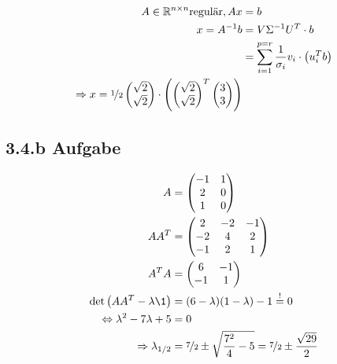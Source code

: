 \begin{equation}\begin{split}
    A\in {\mathbb R}^{n\times n} \text{regulär}, Ax &= b\\
    x = A^{-1} b &= V\Sigma^{-1}U^T\cdot b\\
    &=\sum_{i=1}^{p=r}\frac{1}{\sigma_i} v_i \cdot \left(u_i^Tb\right)\\
    \Rightarrow 
    x = 
    \nicefrac{1}{2}
    \begin{pmatrix}
	    \sqrt{2}\\\sqrt{2}
    \end{pmatrix}
    \cdot 
    \left(
   		\begin{pmatrix}
   			\sqrt{2}\\\sqrt{2}
   		\end{pmatrix}^T
   		\begin{pmatrix}
	   		3\\3
   		\end{pmatrix}
	\right)
\end{split}\end{equation}


\subsection*{3.4.b Aufgabe}

\begin{equation}\begin{split}
    A &= \begin{pmatrix}
	    -1&1\\
	    2&0\\
	    1&0
    \end{pmatrix}\\
    AA^T
    &=
    \begin{pmatrix}
	    2&-2&-1\\
	    -2&4&2\\
	    -1&2&1
    \end{pmatrix}\\
    A^TA
    &=
    \begin{pmatrix}
	    6&-1\\
	    -1&1
    \end{pmatrix}\\
    \det\left(AA^T-\lambda \1\right)
    &=
    (6-\lambda)(1-\lambda) -1 \stackrel{!}{=} 0\\
    \Leftrightarrow
    \lambda^2 -7\lambda + 5 &= 0\\
    \Rightarrow
    \lambda_{1/2} 
    &=
    \nicefrac{7}{2} \pm \sqrt{\frac{7^2}{4} -5}
    =
	\nicefrac{7}{2} \pm \frac{\sqrt{29}}{2}
\end{split}\end{equation}

